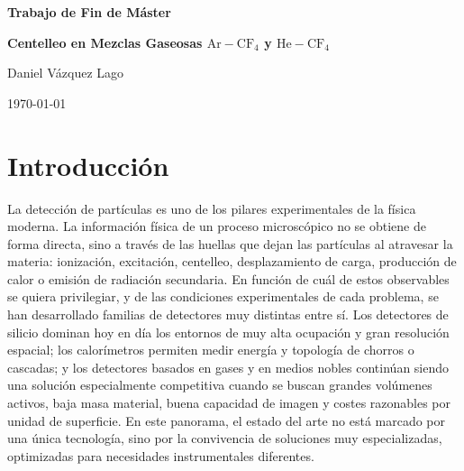 \documentclass[12pt,a4paper]{article}
\newcommand{\He}{\mathrm{He}}
\newcommand{\Ar}{\mathrm{Ar}}
\newcommand{\CF}{\mathrm{CF}}
\begin{document}

\thispagestyle{empty}
\begin{titlepage}
    \centering
    \vspace*{0.20\textheight}

    {\Huge\bfseries Trabajo de Fin de Máster\par}
    \vspace{2.2em}

    {\LARGE\bfseries Centelleo en Mezclas Gaseosas $\Ar-\CF_4$ y $\He-\CF_4$\par}
    \vspace{5em}

    {\Large Daniel Vázquez Lago\par}
    \vspace{2.2em}

    {\Large \today\par}
\end{titlepage}

\pagestyle{empty}
\tableofcontents
\clearpage

\setlength{\parindent}{0pt}
\setlength{\parskip}{0.45em}

\pagestyle{fancy}

\section{Introducción}

La detección de partículas es uno de los pilares experimentales de la física moderna. La información física de un proceso microscópico no se obtiene de forma directa, sino a través de las huellas que dejan las partículas al atravesar la materia: ionización, excitación, centelleo, desplazamiento de carga, producción de calor o emisión de radiación secundaria. En función de cuál de estos observables se quiera privilegiar, y de las condiciones experimentales de cada problema, se han desarrollado familias de detectores muy distintas entre sí. Los detectores de silicio dominan hoy en día los entornos de muy alta ocupación y gran resolución espacial; los calorímetros permiten medir energía y topología de chorros o cascadas; y los detectores basados en gases y en medios nobles continúan siendo una solución especialmente competitiva cuando se buscan grandes volúmenes activos, baja masa material, buena capacidad de imagen y costes razonables por unidad de superficie. En este panorama, el estado del arte no está marcado por una única tecnología, sino por la convivencia de soluciones muy especializadas, optimizadas para necesidades instrumentales diferentes.
\end{document}
